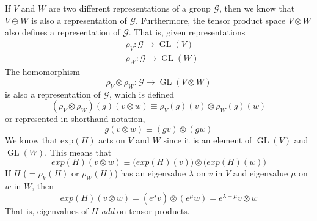 \documentclass{article}
\DeclareMathOperator{\GL}{GL}
\begin{document}
      \begin{definition}
        If $V$ and $W$ are two different representations of a group $\mathcal{G}$, then we know that $V \oplus W$ is also a representation of $\mathcal{G}$. Furthermore, the tensor product space $V \otimes W$ also defines a representation of $\mathcal{G}$. That is, given representations
        \begin{align*}
          & \rho_V: \mathcal{G} \longrightarrow \GL(V) \\
          & \rho_W: \mathcal{G} \longrightarrow \GL(W)
        \end{align*}
        The homomorphism 
        \begin{equation}
          \rho_V \otimes \rho_W: \mathcal{G} \longrightarrow \GL(V \otimes W)
        \end{equation}
        is also a representation of $\mathcal{G}$, which is defined
        \begin{equation}
          (\rho_V \otimes \rho_W)(g) (v \otimes w) \equiv \rho_V (g) (v) \otimes \rho_W (g) (w)
        \end{equation}
        or represented in shorthand notation, 
        \begin{equation}
          g(v \otimes w) \equiv (g v) \otimes (g w)
        \end{equation}
        We know that exp$(H)$ acts on $V$ and $W$ since it is an element of $\GL(V)$ and $\GL(W)$. This means that
        \begin{equation}
          exp(H)(v \otimes w) \equiv \big( exp(H)(v)\big) \otimes \big( exp(H)(w)\big)
        \end{equation}
        If $H$ ($= \rho_V (H)$ or $\rho_W(H)$) has an eigenvalue $\lambda$ on $v$ in $V$ and eigenvalue $\mu$ on $w$ in $W$, then 
        \begin{equation}
          exp(H) (v \otimes w) = (e^\lambda v) \otimes (e^\mu w) = e^{\lambda + \mu} v \otimes w
        \end{equation}
        That is, eigenvalues of $H$ \textit{add} on tensor products. 
      \end{definition}
\end{document}
